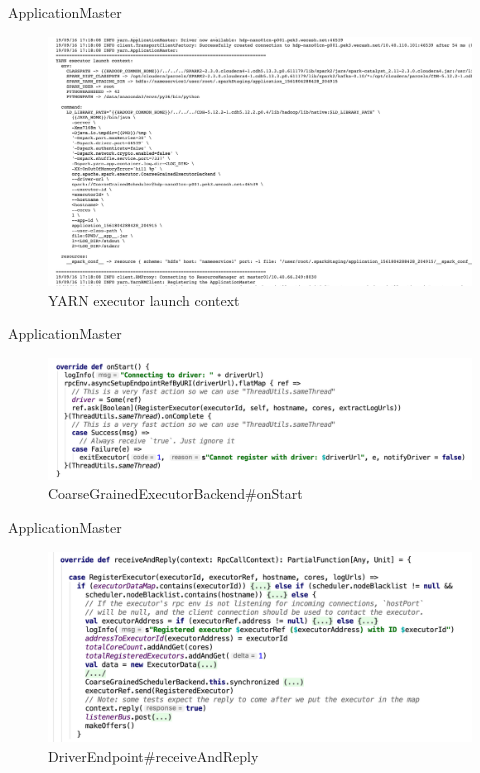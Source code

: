 \begin{frame}[plain,t]{ApplicationMaster} %
	 \\ 
	\begin{figure}
		\centering
		\includegraphics[width=0.9\linewidth]{images/app009}
		\caption{YARN executor launch context}
		\label{fig:app009}
	\end{figure}
	
	
\end{frame}
\begin{frame}[plain,t]{ApplicationMaster} %
	 \\  \vspace{2ex}
	\begin{figure}
		\centering
		\includegraphics[width=0.9\linewidth]{images/app010}
		\caption{CoarseGrainedExecutorBackend\#onStart}
		\label{fig:app010}
	\end{figure}
	
	
\end{frame}
\begin{frame}[plain,t]{ApplicationMaster} %
	 \\  \vspace{2ex}
\begin{figure}
	\centering
	\includegraphics[width=0.9\linewidth]{images/app011}
	\caption{DriverEndpoint\#receiveAndReply}
	\label{fig:app011}
\end{figure}

\end{frame}
